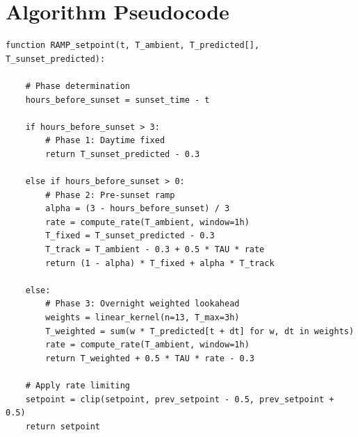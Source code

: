 \documentclass[11pt,letterpaper]{article}
\begin{document}
\appendix
\section{Algorithm Pseudocode}

\begin{verbatim}
function RAMP_setpoint(t, T_ambient, T_predicted[], T_sunset_predicted):

    # Phase determination
    hours_before_sunset = sunset_time - t

    if hours_before_sunset > 3:
        # Phase 1: Daytime fixed
        return T_sunset_predicted - 0.3

    else if hours_before_sunset > 0:
        # Phase 2: Pre-sunset ramp
        alpha = (3 - hours_before_sunset) / 3
        rate = compute_rate(T_ambient, window=1h)
        T_fixed = T_sunset_predicted - 0.3
        T_track = T_ambient - 0.3 + 0.5 * TAU * rate
        return (1 - alpha) * T_fixed + alpha * T_track

    else:
        # Phase 3: Overnight weighted lookahead
        weights = linear_kernel(n=13, T_max=3h)
        T_weighted = sum(w * T_predicted[t + dt] for w, dt in weights)
        rate = compute_rate(T_ambient, window=1h)
        return T_weighted + 0.5 * TAU * rate - 0.3

    # Apply rate limiting
    setpoint = clip(setpoint, prev_setpoint - 0.5, prev_setpoint + 0.5)
    return setpoint
\end{verbatim}
\end{document}

